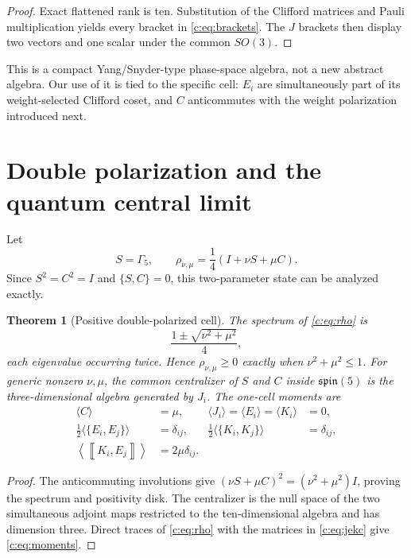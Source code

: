 \documentclass[11pt]{article}
\newtheorem{theorem}{Theorem}[section]
\theoremstyle{remark}\newtheorem{remark}[theorem]{Remark}
\newcommand{\Hbr}[2]{\left\llbracket #1,#2\right\rrbracket}
\begin{document}
\begin{proof}
Exact flattened rank is ten.  Substitution of the Clifford matrices and Pauli multiplication yields every bracket in \eqref{c:eq:brackets}.  The $J$ brackets then display two vectors and one scalar under the common $SO(3)$.
\end{proof}

This is a compact Yang/Snyder-type phase-space algebra, not a new abstract algebra.  Our use of it is tied to the specific cell: $E_i$ are simultaneously part of its weight-selected Clifford coset, and $C$ anticommutes with the weight polarization introduced next.

\section{Double polarization and the quantum central limit}

Let
\begin{equation}
S=\Gamma_5,\qquad
\rho_{\nu,\mu}=\frac14(I+\nu S+\mu C).
\label{c:eq:rho}
\end{equation}
Since $S^2=C^2=I$ and $\{S,C\}=0$, this two-parameter state can be analyzed exactly.

\begin{theorem}[Positive double-polarized cell]\label{c:thm:positive}
The spectrum of \eqref{c:eq:rho} is
\begin{equation}
\frac{1\pm\sqrt{\nu^2+\mu^2}}4,
\end{equation}
each eigenvalue occurring twice.  Hence $\rho_{\nu,\mu}\geq0$ exactly when
$\nu^2+\mu^2\leq1$.  For generic nonzero $\nu,\mu$, the common centralizer of $S$ and $C$ inside $\mathfrak{spin}(5)$ is the three-dimensional algebra generated by $J_i$.  The one-cell moments are
\begin{align}
\langle C\rangle&=\mu,&
\langle J_i\rangle=\langle E_i\rangle=\langle K_i\rangle&=0,\nonumber\\
\frac12\langle\{E_i,E_j\}\rangle&=\delta_{ij},&
\frac12\langle\{K_i,K_j\}\rangle&=\delta_{ij},\label{c:eq:moments}\\
\left\langle\Hbr{K_i}{E_j}\right\rangle&=2\mu\delta_{ij}.&&
\end{align}
\end{theorem}

\begin{proof}
The anticommuting involutions give $(\nu S+\mu C)^2=(\nu^2+\mu^2)I$, proving the spectrum and positivity disk.  The centralizer is the null space of the two simultaneous adjoint maps restricted to the ten-dimensional algebra and has dimension three.  Direct traces of \eqref{c:eq:rho} with the matrices in \eqref{c:eq:jekc} give \eqref{c:eq:moments}.
\end{proof}
\end{document}

